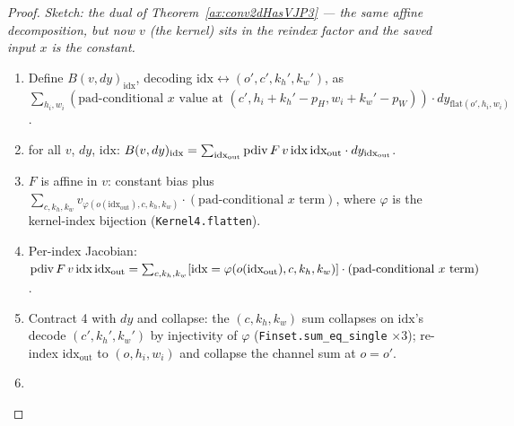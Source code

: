 \begin{proof}
\leanok
\emph{Sketch: the dual of Theorem~\ref{ax:conv2dHasVJP3} --- the
same affine decomposition, but now \(v\) (the kernel) sits in the
reindex factor and the saved input \(x\) is the constant.}
\begin{enumerate}
  \item Define \(B(v, dy)_{\mathrm{idx}}\), decoding
    \(\mathrm{idx} \leftrightarrow (o', c', k_h', k_w')\), as
    \(\sum_{h_i, w_i} (\text{pad-conditional } x \text{ value at }
      (c', h_i + k_h' - p_H, w_i + k_w' - p_W))
      \cdot dy_{\mathrm{flat}(o', h_i, w_i)}\).
  \item \Suffices{} for all \(v\), \(dy\), \(\mathrm{idx}\):
    \(B(v, dy)_{\mathrm{idx}} = \sum_{\mathrm{idx_{out}}}
      \operatorname{pdiv} F\, v\, \mathrm{idx}\, \mathrm{idx_{out}} \cdot
      dy_{\mathrm{idx_{out}}}\).
  \item \(F\) is affine in \(v\): constant bias plus
    \(\sum_{c, k_h, k_w} v_{\varphi(o(\mathrm{idx_{out}}), c, k_h, k_w)}
      \cdot (\text{pad-conditional } x \text{ term})\), where
    \(\varphi\) is the kernel-index bijection
    (\texttt{Kernel4.flatten}).
  \item Per-index Jacobian:
    \(\operatorname{pdiv} F\, v\, \mathrm{idx}\, \mathrm{idx_{out}}
      = \sum_{c, k_h, k_w}
        [\mathrm{idx} = \varphi(o(\mathrm{idx_{out}}), c, k_h, k_w)]
        \cdot (\text{pad-conditional } x \text{ term})\).
  \item Contract 4 with \(dy\) and collapse: the \((c, k_h, k_w)\)
    sum collapses on \(\mathrm{idx}\)'s decode
    \((c', k_h', k_w')\) by injectivity of \(\varphi\)
    (\texttt{Finset.sum\_eq\_single} \(\times 3\)); re-index
    \(\mathrm{idx_{out}}\) to \((o, h_i, w_i)\) and collapse the
    channel sum at \(o = o'\).
  \item \Qed{}
\end{enumerate}
\end{proof}

